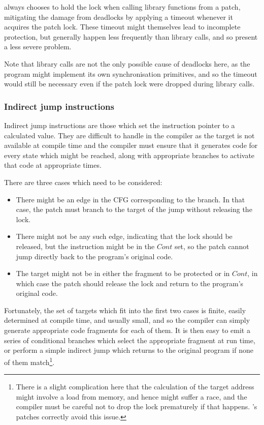 {\Implementation} always chooses to hold the lock when calling library
functions from a patch, mitigating the damage from deadlocks by
applying a timeout whenever it acquires the patch lock.  These timeout
might themselves lead to incomplete protection, but generally happen
less frequently than library calls, and so present a less severe
problem.

Note that library calls are not the only possible cause of deadlocks
here, as the program might implement its own synchronisation
primitives\needCite{}, and so the timeout would still be necessary
even if the patch lock were dropped during library calls.

\subsubsection{Indirect jump instructions}


Indirect jump instructions are those which set the instruction pointer
to a calculated value.  They are difficult to handle in the compiler
as the target is not available at compile time and the compiler must
ensure that it generates code for every state which might be reached,
along with appropriate branches to activate that code at appropriate
times.

There are three cases which need to be considered:

\begin{itemize}
\item There might be an edge in the CFG corresponding to the branch.
  In that case, the patch must branch to the target of the jump
  without releasing the lock.
\item There might not be any such edge, indicating that the lock
  should be released, but the instruction might be in the
  $\mathit{Cont}$ set, so the patch cannot jump directly back to the
  program's original code.
\item The target might not be in either the fragment to be protected
  or in $\mathit{Cont}$, in which case the patch should release the
  lock and return to the program's original code.
\end{itemize}

Fortunately, the set of targets which fit into the first two cases is
finite, easily determined at compile time, and usually small, and so
the compiler can simply generate appropriate code fragments for each
of them.  It is then easy to emit a series of conditional branches
which select the appropriate fragment at run time, or perform a simple
indirect jump which returns to the original program if none of them
match\footnote{There is a slight complication here that the
  calculation of the target address might involve a load from memory,
  and hence might suffer a race, and the compiler must be careful not
  to drop the lock prematurely if that happens.  {\Implementation}'s
  patches correctly avoid this issue.}.

